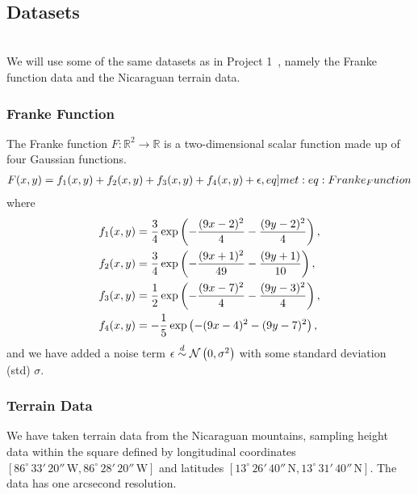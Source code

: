 \\
\subsection{Datasets}
    \\
    We will use some of the same datasets as in Project 1~\citep{Project1}, namely the Franke function data and the Nicaraguan terrain data.
    \subsubsection{Franke Function}
        The Franke function $F: \mathbb{R}^2 \to \mathbb{R}$ is a two-dimensional scalar function made up of four Gaussian functions.
        \begin{align}
            F(x,y) = f_1(x,y) + f_2(x,y) + f_3(x,y) + f_4(x,y) + \epsilon, \label[eq]{met:eq:Franke_Function}
        \end{align}
        where
        \begin{subequations}
            \begin{align}
                f_1(x,y) &= \frac{3}{4}\operatorname{exp}\left( -\frac{(9x-2)^2}{4} - \frac{(9y-2)^2}{4} \right), \\
                f_2(x,y) &= \frac{3}{4}\operatorname{exp}\left( -\frac{(9x+1)^2}{49} - \frac{(9y+1)}{10} \right), \\
                f_3(x,y) &= \frac{1}{2}\operatorname{exp}\left( -\frac{(9x-7)^2}{4} - \frac{(9y-3)^2}{4} \right), \\
                f_4(x,y) &= -\frac{1}{5}\operatorname{exp}\left( -(9x-4)^2 - (9y-7)^2 \right),
            \end{align}
        \end{subequations}
        and we have added a noise term $\epsilon \overset{d}{\sim} \operatorname{\mathcal{N}}\left(0,\sigma^2\right)$ with some standard deviation (std) $\sigma$.

    \subsubsection{Terrain Data}
        We have taken terrain data from the Nicaraguan mountains, sampling height data within the square defined by longitudinal coordinates $[86^\circ\,33'\,20''\,\text{W}, 86^\circ\,28'\,20''\,\text{W}]$ and latitudes $[13^\circ\,26'\,40''\,\text{N}, 13^\circ\,31'\,40''\,\text{N}]$. The data has one arcsecond resolution.


